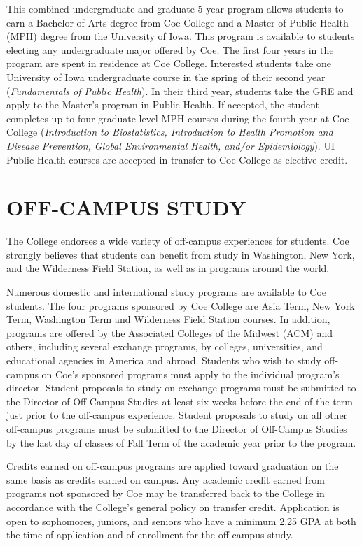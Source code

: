 \documentclass[
  letterpaper,
]{scrbook}
\begin{document}
This combined undergraduate and graduate 5-year program allows students
to earn a Bachelor of Arts degree from Coe College and a Master of
Public Health (MPH) degree from the University of Iowa. This program is
available to students electing any undergraduate major offered by Coe.
The first four years in the program are spent in residence at Coe
College. Interested students take one University of Iowa undergraduate
course in the spring of their second year (\emph{Fundamentals of Public
Health}). In their third year, students take the GRE and apply to the
Master's program in Public Health. If accepted, the student completes up
to four graduate-level MPH courses during the fourth year at Coe College
(\emph{Introduction to Biostatistics, Introduction to Health Promotion
and Disease Prevention, Global Environmental Health, and/or
Epidemiology}). UI Public Health courses are accepted in transfer to Coe
College as elective credit.

\chapter{OFF-CAMPUS STUDY}\label{off-campus-study}

The College endorses a wide variety of off-campus experiences for
students. Coe strongly believes that students can benefit from study in
Washington, New York, and the Wilderness Field Station, as well as in
programs around the world.

Numerous domestic and international study programs are available to Coe
students. The four programs sponsored by Coe College are Asia Term, New
York Term, Washington Term and Wilderness Field Station courses. In
addition, programs are offered by the Associated Colleges of the Midwest
(ACM) and others, including several exchange programs, by colleges,
universities, and educational agencies in America and abroad. Students
who wish to study off-campus on Coe's sponsored programs must apply to
the individual program's director. Student proposals to study on
exchange programs must be submitted to the Director of Off-Campus
Studies at least six weeks before the end of the term just prior to the
off-campus experience. Student proposals to study on all other
off-campus programs must be submitted to the Director of Off-Campus
Studies by the last day of classes of Fall Term of the academic year
prior to the program.

Credits earned on off-campus programs are applied toward graduation on
the same basis as credits earned on campus. Any academic credit earned
from programs not sponsored by Coe may be transferred back to the
College in accordance with the College's general policy on transfer
credit. Application is open to sophomores, juniors, and seniors who have
a minimum 2.25 GPA at both the time of application and of enrollment for
the off-campus study.
\end{document}

